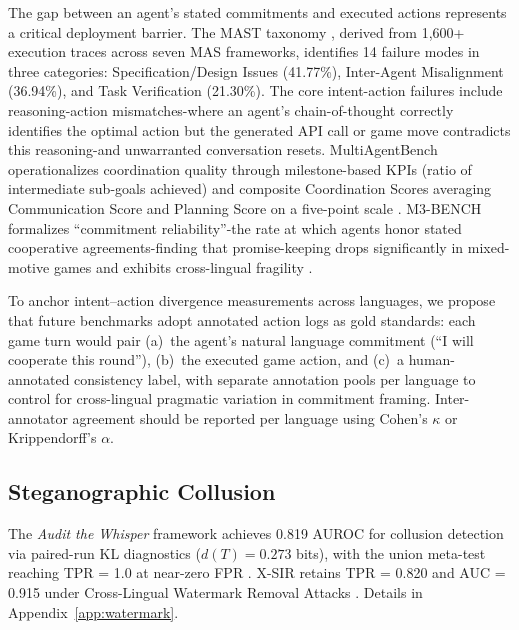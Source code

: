 \documentclass[11pt]{article}
\begin{document}
The gap between an agent's stated commitments and executed actions represents a critical deployment barrier. The MAST taxonomy \citep{cemri2025mast}, derived from 1,600+ execution traces across seven MAS frameworks, identifies 14 failure modes in three categories: Specification/Design Issues (41.77\%), Inter-Agent Misalignment (36.94\%), and Task Verification (21.30\%). The core intent-action failures include reasoning-action mismatches-where an agent's chain-of-thought correctly identifies the optimal action but the generated API call or game move contradicts this reasoning-and unwarranted conversation resets. MultiAgentBench operationalizes coordination quality through milestone-based KPIs (ratio of intermediate sub-goals achieved) and composite Coordination Scores averaging Communication Score and Planning Score on a five-point scale \citep{nie2025multiagentbench}. M3-BENCH formalizes ``commitment reliability''-the rate at which agents honor stated cooperative agreements-finding that promise-keeping drops significantly in mixed-motive games and exhibits cross-lingual fragility \citep{xie2026m3bench}.

To anchor intent--action divergence measurements across languages, we propose that future benchmarks adopt annotated action logs as gold standards: each game turn would pair (a)~the agent's natural language commitment (``I will cooperate this round''), (b)~the executed game action, and (c)~a human-annotated consistency label, with separate annotation pools per language to control for cross-lingual pragmatic variation in commitment framing. Inter-annotator agreement should be reported per language using Cohen's $\kappa$ or Krippendorff's $\alpha$.

\subsection{Steganographic Collusion}
\label{sec:steganography}

The \textit{Audit the Whisper} framework achieves 0.819 AUROC for collusion detection via paired-run KL diagnostics ($d(T) = 0.273$ bits), with the union meta-test reaching TPR = 1.0 at near-zero FPR \citep{roger2025auditwhisper}. X-SIR retains TPR = 0.820 and AUC = 0.915 under Cross-Lingual Watermark Removal Attacks \citep{he2024xsir}. Details in Appendix~\ref{app:watermark}.

\end{document}
